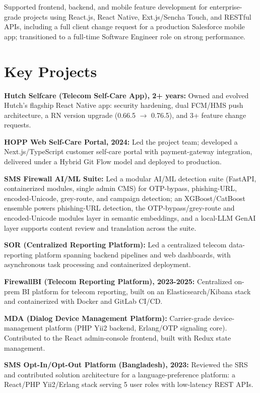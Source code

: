 \documentclass[10.5pt]{article}
\begin{document}
\begin{cvitems}
  \item Supported frontend, backend, and mobile feature development for enterprise-grade projects using React.js, React Native, Ext.js/Sencha Touch, and RESTful APIs, including a full client change request for a production Salesforce mobile app; transitioned to a full-time Software Engineer role on strong performance.
\end{cvitems}

\section*{Key Projects}
\begin{cvitems}
  \item \textbf{Hutch Selfcare (Telecom Self-Care App), 2+ years:} Owned and evolved Hutch's flagship React Native app: security hardening, dual FCM/HMS push architecture, a RN version upgrade (0.66.5 $\rightarrow$ 0.76.5), and 3+ feature change requests.
  \item \textbf{HOPP Web Self-Care Portal, 2024:} Led the project team; developed a Next.js/TypeScript customer self-care portal with payment-gateway integration, delivered under a Hybrid Git Flow model and deployed to production.
  \item \textbf{SMS Firewall AI/ML Suite:} Led a modular AI/ML detection suite (FastAPI, containerized modules, single admin CMS) for OTP-bypass, phishing-URL, encoded-Unicode, grey-route, and campaign detection; an XGBoost/CatBoost ensemble powers phishing-URL detection, the OTP-bypass/grey-route and encoded-Unicode modules layer in semantic embeddings, and a local-LLM GenAI layer supports content review and translation across the suite.
  \item \textbf{SOR (Centralized Reporting Platform):} Led a centralized telecom data-reporting platform spanning backend pipelines and web dashboards, with asynchronous task processing and containerized deployment.
  \item \textbf{FirewallBI (Telecom Reporting Platform), 2023-2025:} Centralized on-prem BI platform for telecom reporting, built on an Elasticsearch/Kibana stack and containerized with Docker and GitLab CI/CD.
  \item \textbf{MDA (Dialog Device Management Platform):} Carrier-grade device-management platform (PHP Yii2 backend, Erlang/OTP signaling core). Contributed to the React admin-console frontend, built with Redux state management.
  \item \textbf{SMS Opt-In/Opt-Out Platform (Bangladesh), 2023:} Reviewed the SRS and contributed solution architecture for a language-preference platform: a React/PHP Yii2/Erlang stack serving 5 user roles with low-latency REST APIs.
\end{cvitems}
\end{document}
